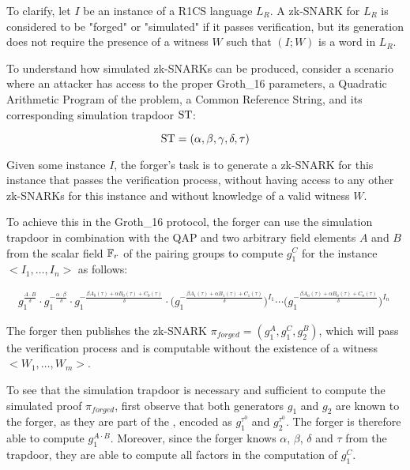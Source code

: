 To clarify, let $I$ be an instance of a R1CS language $L_R$. A zk-SNARK for $L_R$ is considered to be "forged" or "simulated" if it passes verification, but its generation does not require the presence of a witness $W$ such that $(I;W)$ is a word in $L_R$.

To understand how simulated zk-SNARKs can be produced, consider a scenario where an attacker has access to the proper Groth\_16 parameters, a Quadratic Arithmetic Program of the problem, a Common Reference String, and its corresponding simulation trapdoor $\mathrm{ST}$:

\begin{equation}
\mathrm{ST} = (\alpha,\beta,\gamma,\delta,\tau)
\end{equation}

Given some instance $I$, the forger's task is to generate a zk-SNARK for this instance that passes the verification process, without having access to any other zk-SNARKs for this instance and without knowledge of a valid witness $W$.

To achieve this in the Groth\_16 protocol, the forger can use the simulation trapdoor in combination with the QAP and two arbitrary field elements $A$ and $B$ from the scalar field $\mathbb{F}_r$ of the pairing groups to compute $g_1^C$ for the instance $<I_1,\ldots,I_n>$ as follows:

\begin{align}
\label{def:groth16-simulated-proof}
g_1^{\frac{A\cdot B}{\delta}}\cdot g_1^{-\frac{\alpha\cdot \beta}{\delta}}\cdot g_1^{-\frac{\beta A_0(\tau) + \alpha B_0(\tau)+ C_0(\tau)}{\delta}}\cdot \Big(g_1^{-\frac{\beta A_1(\tau) + \alpha B_1(\tau)+ C_1(\tau)}{\delta}}\Big)^{I_1}\cdots \Big(g_1^{-\frac{\beta A_n(\tau) + \alpha B_n(\tau)+ C_n(\tau)}{\delta}}\Big)^{I_n}\
\end{align} 

The forger then publishes the zk-SNARK $\pi_{forged} = (g_1^A, g_1^C, g_2^B)$, which will pass the verification process and is computable without the existence of a witness $<W_1,\ldots,W_m>$.

To see that the simulation trapdoor is necessary and sufficient to compute the simulated proof $\pi_{forged}$, first observe that both generators $g_1$ and $g_2$ are known to the forger, as they are part of the , encoded as $g_1^{\tau^0}$ and $g_2^{\tau^0}$. The forger is therefore able to compute $g_1^{A\cdot B}$. Moreover, since the forger knows $\alpha$, $\beta$, $\delta$ and $\tau$ from the trapdoor, they are able to compute all factors in the computation of $g_1^C$.

